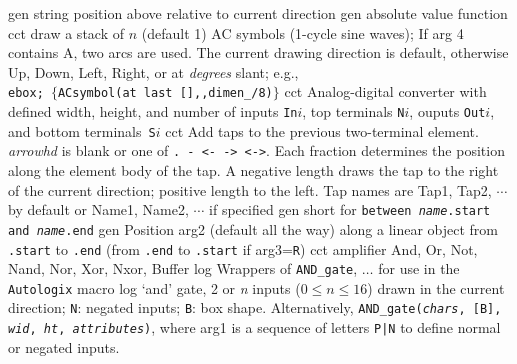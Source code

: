 %
%
  {gen}%
  {string position above relative to current direction}%
%
  {gen}%
  {absolute value function}%
%
  {cct}%
  {draw a stack of $n$ (default 1) AC symbols
   (1-cycle sine waves); If arg 4 contains A, two arcs
   are used.  The current drawing direction is default, otherwise Up, Down,
   Left, Right, or at {\sl degrees} slant;  e.g.,\\ 
   {\tt ebox; $\lbrace$ACsymbol(at last [],{,}dimen\_/8)$\rbrace$}}%
%
  {cct}%
  {Analog-digital converter with defined width, height, and number of
   inputs {\tt In$i$}, top terminals {\tt N$i$}, ouputs {\tt Out$i$},
    and bottom terminals~{\tt S$i$}}%
%
  {cct}%
  {Add taps to the previous two-terminal element.
   {\sl arrowhd} is blank or one of {\tt . - <- -> <->}.
   Each fraction determines the position along the element body of the tap.
   A negative length draws the tap to the right of the current
   direction; positive length to the left.
   Tap names are Tap1, Tap2, $\cdots$ by default  or
   Name1, Name2, $\cdots$ if specified 
   }%
%
  {gen}%
  {short for {\tt between {\sl name}.start and {\sl name}.end}}%
%
  {gen}%
  {Position arg2 (default all the way) along a linear object
   from {\tt .start} to {\tt .end}
   (from {\tt .end} to {\tt .start} if arg3={\tt R}) }%
%
  {cct}%
  {amplifier}%
%
 {And, Or, Not, Nand, Nor, Xor, Nxor, Buffer}{}%
  {log}%
  {Wrappers of {\tt AND\_gate}, $\ldots$ for use in the {\tt Autologix}
   macro}%
%
  {log}%
  {`and' gate, 2 or {\sl n\/} inputs ($0 \leq n \leq 16$) drawn in the
   current direction;
   {\tt N}: negated inputs; {\tt B}: box shape.
   Alternatively, {\tt AND\_gate({\sl chars}, [B], {\sl wid},
    {\sl ht}, {\sl attributes})}, where
   arg1 is a sequence of letters {\tt P|N} to define
   normal or negated inputs.
    }%
%
